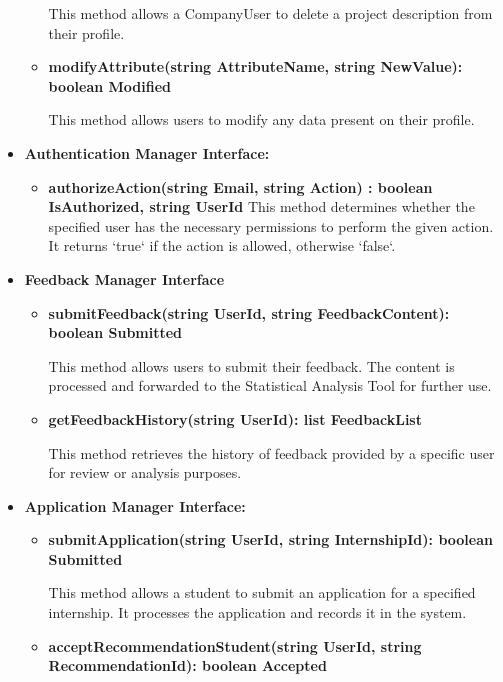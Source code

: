 \begin{itemize}
\begin{itemize}
    This method allows a CompanyUser to delete a project description from their profile.

    \item \textbf{modifyAttribute(string AttributeName, string NewValue): boolean Modified}
    
    This method allows users to modify any data present on their profile.
    \end{itemize}

\item \textbf{Authentication Manager Interface:}
\begin{itemize}

\item \textbf{authorizeAction(string Email, string Action) : boolean IsAuthorized, string UserId}  
This method determines whether the specified user has the necessary permissions to perform the given action. It returns `true` if the action is allowed, otherwise `false`.


\end{itemize}

\item \textbf{Feedback Manager Interface}
    \begin{itemize}

    \item \textbf{submitFeedback(string UserId, string FeedbackContent): boolean Submitted}

    This method allows users to submit their feedback. The content is processed and forwarded to the Statistical Analysis Tool for further use.

    \item \textbf{getFeedbackHistory(string UserId): list FeedbackList}

    This method retrieves the history of feedback provided by a specific user for review or analysis purposes.
    \end{itemize}
\item \textbf{Application Manager Interface:}
\begin{itemize}
    \item \textbf{submitApplication(string UserId, string InternshipId): boolean Submitted}

    This method allows a student to submit an application for a specified internship. It processes the application and records it in the system.

    \item \textbf{acceptRecommendationStudent(string UserId, string RecommendationId): boolean Accepted}


\end{itemize}
\end{itemize}
